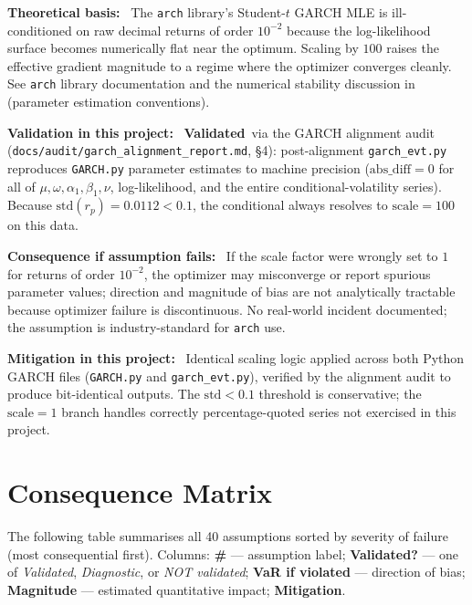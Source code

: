 \documentclass[11pt,a4paper]{article}
\newcommand{\asmfield}[1]{\medskip\noindent\textbf{#1:}\ }
\newcommand{\validated}{\textbf{Validated}}
\begin{document}
\asmfield{Theoretical basis}
The \texttt{arch} library's Student-$t$ GARCH MLE is ill-conditioned on
raw decimal returns of order $10^{-2}$ because the log-likelihood surface
becomes numerically flat near the optimum. Scaling by $100$ raises the
effective gradient magnitude to a regime where the optimizer converges
cleanly. See \texttt{arch} library documentation and the numerical stability
discussion in \cite{Bollerslev1986} (parameter estimation conventions).

\asmfield{Validation in this project}
\validated\ via the GARCH alignment audit
(\texttt{docs/audit/garch\_alignment\_report.md}, \S{}4):
post-alignment \texttt{garch\_evt.py} reproduces \texttt{GARCH.py}
parameter estimates to machine precision ($\mathrm{abs\_diff} = 0$ for
all of $\mu, \omega, \alpha_1, \beta_1, \nu$, log-likelihood, and the
entire conditional-volatility series). Because $\mathrm{std}(r_p) =
0.0112 < 0.1$, the conditional always resolves to $\mathrm{scale} = 100$
on this data.

\asmfield{Consequence if assumption fails}
If the scale factor were wrongly set to $1$ for returns of order
$10^{-2}$, the optimizer may misconverge or report spurious parameter
values; direction and magnitude of bias are not analytically tractable
because optimizer failure is discontinuous.  No real-world incident
documented; the assumption is industry-standard for \texttt{arch} use.

\asmfield{Mitigation in this project}
Identical scaling logic applied across both Python GARCH files
(\texttt{GARCH.py} and \texttt{garch\_evt.py}), verified by the alignment
audit to produce bit-identical outputs. The $\mathrm{std} < 0.1$ threshold
is conservative; the $\mathrm{scale} = 1$ branch handles correctly
percentage-quoted series not exercised in this project.

\section{Consequence Matrix}\label{sec:consequence-matrix}

The following table summarises all 40 assumptions sorted by severity of
failure (most consequential first). Columns: \textbf{\#} --- assumption
label; \textbf{Validated?} --- one of \emph{Validated}, \emph{Diagnostic},
or \emph{NOT validated}; \textbf{VaR if violated} --- direction of bias;
\textbf{Magnitude} --- estimated quantitative impact; \textbf{Mitigation}.
\end{document}
